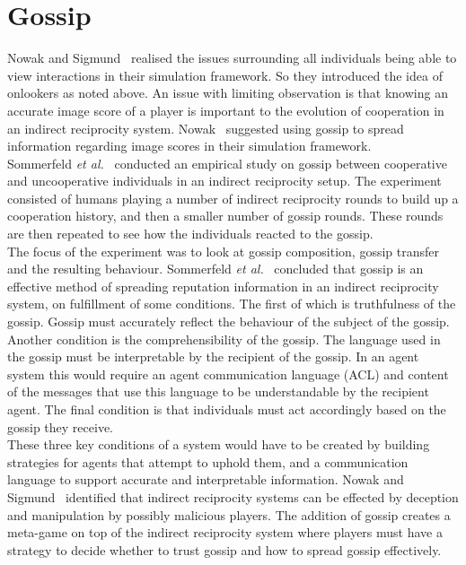 \documentclass[]{final_report}
\begin{document}
\section{Gossip}
Nowak and Sigmund~\cite{evol_indirect_image} realised the issues surrounding all individuals being able to view interactions in their simulation framework. So they introduced the idea of onlookers as noted above. An issue with limiting observation is that knowing an accurate image score of a player is important to the evolution of cooperation in an indirect reciprocity system. Nowak~\cite{five_rules_coop} suggested using gossip to spread information regarding image scores in their simulation framework.\\
Sommerfeld \textit{et al.}~\cite{gossip_alt} conducted an empirical study on gossip between cooperative and uncooperative individuals in an indirect reciprocity setup. The experiment consisted of humans playing a number of indirect reciprocity rounds to build up a cooperation history, and then a smaller number of gossip rounds. These rounds are then repeated to see how the individuals reacted to the gossip.\\
The focus of the experiment was to look at gossip composition, gossip transfer and the resulting behaviour. Sommerfeld \textit{et al.}~\cite{gossip_alt} concluded that gossip is an effective method of spreading reputation information in an indirect reciprocity system, on fulfillment of some conditions. The first of which is truthfulness of the gossip. Gossip must accurately reflect the behaviour of the subject of the gossip.\\
Another condition is the comprehensibility of the gossip. The language used in the gossip must be interpretable by the recipient of the gossip. In an agent system this would require an agent communication language (ACL) and content of the messages that use this language to be understandable by the recipient agent. The final condition is that individuals must act accordingly based on the gossip they receive.\\
These three key conditions of a system would have to be created by building strategies for agents that attempt to uphold them, and a communication language to support accurate and interpretable information. Nowak and Sigmund~\cite{evol_indirect_image} identified that indirect reciprocity systems can be effected by deception and manipulation by possibly malicious players. The addition of gossip creates a meta-game on top of the indirect reciprocity system where players must have a strategy to decide whether to trust gossip and how to spread gossip effectively.
\end{document}
